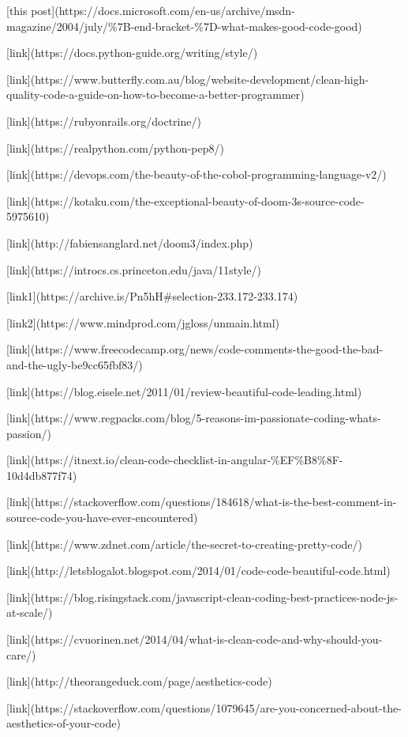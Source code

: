 [this post](https://docs.microsoft.com/en-us/archive/msdn-magazine/2004/july/\%7B-end-bracket-\%7D-what-makes-good-code-good)

[link](https://docs.python-guide.org/writing/style/)

[link](https://www.butterfly.com.au/blog/website-development/clean-high-quality-code-a-guide-on-how-to-become-a-better-programmer)

[link](https://rubyonrails.org/doctrine/)

[link](https://realpython.com/python-pep8/)

[link](https://devops.com/the-beauty-of-the-cobol-programming-language-v2/)

[link](https://kotaku.com/the-exceptional-beauty-of-doom-3s-source-code-5975610)

[link](http://fabiensanglard.net/doom3/index.php)

[link](https://introcs.cs.princeton.edu/java/11style/)

[link1](https://archive.is/Pn5hH#selection-233.172-233.174) 

[link2](https://www.mindprod.com/jgloss/unmain.html)

[link](https://www.freecodecamp.org/news/code-comments-the-good-the-bad-and-the-ugly-be9cc65fbf83/)

[link](https://blog.eisele.net/2011/01/review-beautiful-code-leading.html)

[link](https://www.regpacks.com/blog/5-reasons-im-passionate-coding-whats-passion/)

[link](https://itnext.io/clean-code-checklist-in-angular-\%EF\%B8\%8F-10d4db877f74)

[link](https://stackoverflow.com/questions/184618/what-is-the-best-comment-in-source-code-you-have-ever-encountered)

[link](https://www.zdnet.com/article/the-secret-to-creating-pretty-code/)

[link](http://letsblogalot.blogspot.com/2014/01/code-code-beautiful-code.html)

[link](https://blog.risingstack.com/javascript-clean-coding-best-practices-node-js-at-scale/)

[link](https://cvuorinen.net/2014/04/what-is-clean-code-and-why-should-you-care/)

[link](http://theorangeduck.com/page/aesthetics-code)

[link](https://stackoverflow.com/questions/1079645/are-you-concerned-about-the-aesthetics-of-your-code)

